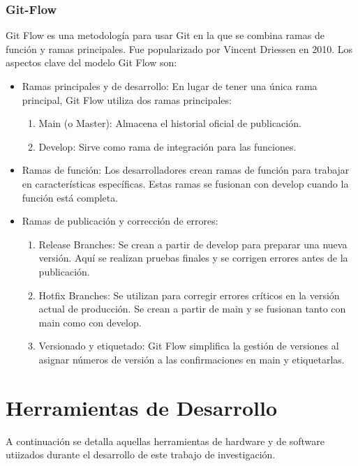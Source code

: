 \subsubsection{Git-Flow}
Git Flow es una metodología para usar Git en la que se combina ramas de función y ramas principales. Fue popularizado por Vincent Driessen en 2010. Los aspectos clave del modelo Git Flow son:
\begin{itemize}
\item Ramas principales y de desarrollo: En lugar de tener una única rama principal, Git Flow utiliza dos ramas principales:
\begin{enumerate}
\item Main (o Master): Almacena el historial oficial de publicación.
\item Develop: Sirve como rama de integración para las funciones.
\end{enumerate}
\item Ramas de función: Los desarrolladores crean ramas de función para trabajar en características específicas. Estas ramas se fusionan con develop cuando la función está completa.
\item Ramas de publicación y corrección de errores:
\begin{enumerate}
\item Release Branches: Se crean a partir de develop para preparar una nueva versión. Aquí se realizan pruebas finales y se corrigen errores antes de la publicación.
\item Hotfix Branches: Se utilizan para corregir errores críticos en la versión actual de producción. Se crean a partir de main y se fusionan tanto con main como con develop.
\item Versionado y etiquetado: Git Flow simplifica la gestión de versiones al asignar números de versión a las confirmaciones en main y etiquetarlas.
\end{enumerate}
\end{itemize}

\section{Herramientas de Desarrollo}
A continuación se detalla aquellas herramientas de hardware y de software utiizados durante el desarrollo de este trabajo de investigación.

